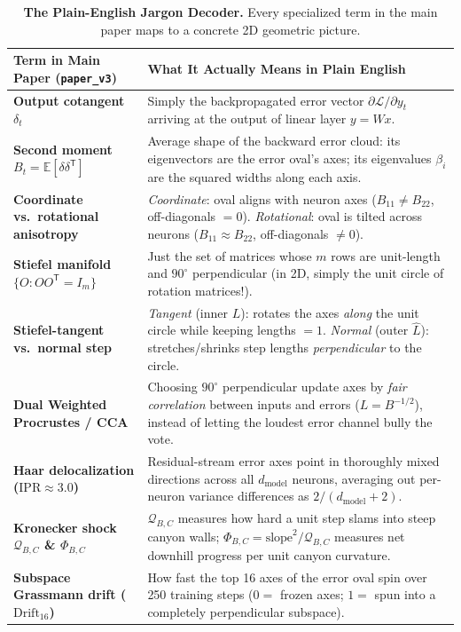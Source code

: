 \documentclass[11pt]{article}
\newcommand{\Tr}{{\mathsf{T}}}
\newcommand{\E}{\mathbb{E}}
\newcommand{\dm}{d_{\mathrm{model}}}
\begin{document}
\begin{table}[t]
  \centering
  \caption{\textbf{The Plain-English Jargon Decoder.} Every specialized term in the main paper maps to a concrete 2D geometric picture.}
  \label{tab:decoder}
  \vspace{2pt}
  \footnotesize
  \renewcommand{\arraystretch}{1.22}
  \begin{tabular}{@{}>{\raggedright\arraybackslash}p{}>{\raggedright\arraybackslash}p{}@{}}
    \toprule
    \textbf{Term in Main Paper (\texttt{paper\_v3})} & \textbf{What It Actually Means in Plain English} \\
    \midrule
    \textbf{Output cotangent $\delta_t$} & Simply the backpropagated error vector $\partial\mathcal{L}/\partial y_t$ arriving at the output of linear layer $y = W x$. \\
    \textbf{Second moment $B_t = \E[\delta\delta^{\Tr}]$} & Average shape of the backward error cloud: its eigenvectors are the error oval's axes; its eigenvalues $\beta_i$ are the squared widths along each axis. \\
    \textbf{Coordinate vs.\ rotational anisotropy} & \emph{Coordinate}: oval aligns with neuron axes ($B_{11} \neq B_{22}$, off-diagonals $=0$). \emph{Rotational}: oval is tilted across neurons ($B_{11} \approx B_{22}$, off-diagonals $\neq 0$). \\
    \textbf{Stiefel manifold $\{O : O O^{\Tr}=I_m\}$} & Just the set of matrices whose $m$ rows are unit-length and $90^\circ$ perpendicular (in 2D, simply the unit circle of rotation matrices!). \\
    \textbf{Stiefel-tangent vs.\ normal step} & \emph{Tangent} (inner $L$): rotates the axes \emph{along} the unit circle while keeping lengths $=1$. \emph{Normal} (outer $\hat{L}$): stretches/shrinks step lengths \emph{perpendicular} to the circle. \\
    \textbf{Dual Weighted Procrustes / CCA} & Choosing $90^\circ$ perpendicular update axes by \emph{fair correlation} between inputs and errors ($L=B^{-1/2}$), instead of letting the loudest error channel bully the vote. \\
    \textbf{Haar delocalization ($\mathrm{IPR} \approx 3.0$)} & Residual-stream error axes point in thoroughly mixed directions across all $\dm$ neurons, averaging out per-neuron variance differences as $2/(\dm+2)$. \\
    \textbf{Kronecker shock $\mathcal{Q}_{B,C}$ \& $\Phi_{B,C}$} & $\mathcal{Q}_{B,C}$ measures how hard a unit step slams into steep canyon walls; $\Phi_{B,C} = \text{slope}^2 / \mathcal{Q}_{B,C}$ measures net downhill progress per unit canyon curvature. \\
    \textbf{Subspace Grassmann drift ($\mathrm{Drift}_{16}$)} & How fast the top 16 axes of the error oval spin over 250 training steps ($0 =$ frozen axes; $1 =$ spun into a completely perpendicular subspace). \\
    \bottomrule
  \end{tabular}
\end{table}
\end{document}
